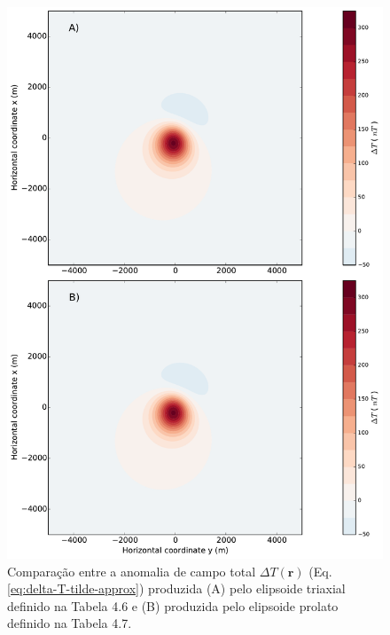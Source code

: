 \begin{figure}[hbt!]
	\centering \includegraphics[width=14.5 cm,height=22 cm]{figures/ellipsoid_triaxial_prolate}
	\caption[Comparação entre a anomalia de campo total $\Delta T (\mathbf{r})$ (Eq. \ref{eq:delta-T-tilde-approx}) produzida (A) pelo elipsoide triaxial definido na Tabela 4.7 e (B) produzida pelo elipsoide prolato definido na Tabela 4.6.]{Comparação entre a anomalia de campo total $\Delta T (\mathbf{r})$ (Eq. \ref{eq:delta-T-tilde-approx}) produzida (A) pelo elipsoide triaxial definido na Tabela 4.6 e (B) produzida pelo elipsoide prolato definido na Tabela 4.7.}
	\label{fig:triaxial_prolate}
\end{figure}

